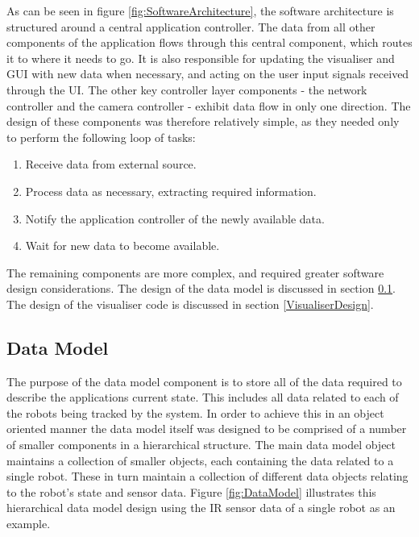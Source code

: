 As can be seen in figure \ref{fig:SoftwareArchitecture}, the software architecture is structured around a central application controller. The data from all other components of the application flows through this central component, which routes it to where it needs to go. It is also responsible for updating the visualiser and GUI with new data when necessary, and acting on the user input signals received through the UI. The other key controller layer components - the network controller and the camera controller - exhibit data flow in only one direction. The design of these components was therefore relatively simple, as they needed only to perform the following loop of tasks:

\begin{enumerate}
 \item Receive data from external source.
 \item Process data as necessary, extracting required information.
 \item Notify the application controller of the newly available data.
 \item Wait for new data to become available.
\end{enumerate}

The remaining components are more complex, and required greater software design considerations. The design of the data model is discussed in section \ref{DataModelDesign}. The design of the visualiser code is discussed in section \ref{VisualiserDesign}.

\subsection{Data Model} \label{DataModelDesign}
The purpose of the data model component is to store all of the data required to describe the applications current state. This includes all data related to each of the robots being tracked by the system. In order to achieve this in an object oriented manner the data model itself was designed to be comprised of a number of smaller components in a hierarchical structure. The main data model object maintains a collection of smaller objects, each containing the data related to a single robot. These in turn maintain a collection of different data objects relating to the robot's state and sensor data. Figure \ref{fig:DataModel} illustrates this hierarchical data model design using the IR sensor data of a single robot as an example.

